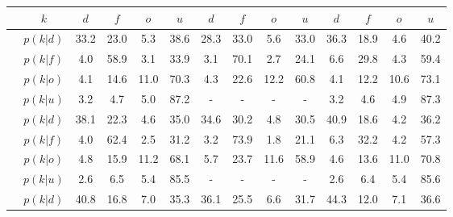 \begin{figure}[H]
\begin{tabular}{c|c|cccc|cccc|cccc}
	&$k$ & $d$ & $f$ & $o$ & $u$ & $d$ & $f$ & $o$ & $u$ & $d$ & $f$ & $o$ & $u$\\
	\hline
	\parbox[t]{2mm}{}&$p(k|d)$ & \textcolor{mygreen}{33.2} & \textcolor{myred}{23.0} & \textcolor{myred}{5.3} & 38.6 & \textcolor{mygreen}{28.3} & \textcolor{myred}{33.0} & \textcolor{myred}{5.6} & 33.0 & \textcolor{mygreen}{36.3} & \textcolor{myred}{18.9} & \textcolor{myred}{4.6} & 40.2\\
	&$p(k|f)$ & \textcolor{myred}{4.0} & \textcolor{mygreen}{58.9} & \textcolor{myred}{3.1} & 33.9 & \textcolor{myred}{3.1} & \textcolor{mygreen}{70.1} & \textcolor{myred}{2.7} & 24.1 & \textcolor{myred}{6.6} & \textcolor{mygreen}{29.8} & \textcolor{myred}{4.3} & 59.4\\
	&$p(k|o)$ & \textcolor{myred}{4.1} & \textcolor{myred}{14.6} & \textcolor{mygreen}{11.0} & 70.3 & \textcolor{myred}{4.3} & \textcolor{myred}{22.6} & \textcolor{mygreen}{12.2} & 60.8 & \textcolor{myred}{4.1} & \textcolor{myred}{12.2} & \textcolor{mygreen}{10.6} & 73.1\\
	&$p(k|u)$ & 3.2 & 4.7 & 5.0 & 87.2 & - & - & - & - & 3.2 & 4.6 & 4.9 & 87.3\\
	\hline
	\parbox[t]{2mm}{}&$p(k|d)$ & \textcolor{mygreen}{38.1} & \textcolor{myred}{22.3} & \textcolor{myred}{4.6} & 35.0 & \textcolor{mygreen}{34.6} & \textcolor{myred}{30.2} & \textcolor{myred}{4.8} & 30.5 & \textcolor{mygreen}{40.9} & \textcolor{myred}{18.6} & \textcolor{myred}{4.2} & 36.2\\
	&$p(k|f)$ & \textcolor{myred}{4.0} & \textcolor{mygreen}{62.4} & \textcolor{myred}{2.5} & 31.2 & \textcolor{myred}{3.2} & \textcolor{mygreen}{73.9} & \textcolor{myred}{1.8} & 21.1 & \textcolor{myred}{6.3} & \textcolor{mygreen}{32.2} & \textcolor{myred}{4.2} & 57.3\\
	&$p(k|o)$ & \textcolor{myred}{4.8} & \textcolor{myred}{15.9} & \textcolor{mygreen}{11.2} & 68.1 & \textcolor{myred}{5.7} & \textcolor{myred}{23.7} & \textcolor{mygreen}{11.6} & 58.9 & \textcolor{myred}{4.6} & \textcolor{myred}{13.6} & \textcolor{mygreen}{11.0} & 70.8\\
	&$p(k|u)$ & 2.6 & 6.5 & 5.4 & 85.5 & - & - & - & - & 2.6 & 6.4 & 5.4 & 85.6\\
	\hline
	\parbox[t]{2mm}{}&$p(k|d)$ & \textcolor{mygreen}{40.8} & \textcolor{myred}{16.8} & \textcolor{myred}{7.0} & 35.3 & \textcolor{mygreen}{36.1} & \textcolor{myred}{25.5} & \textcolor{myred}{6.6} & 31.7 & \textcolor{mygreen}{44.3} & \textcolor{myred}{12.0} & \textcolor{myred}{7.1} & 36.6\\

\end{tabular}
\end{figure}
